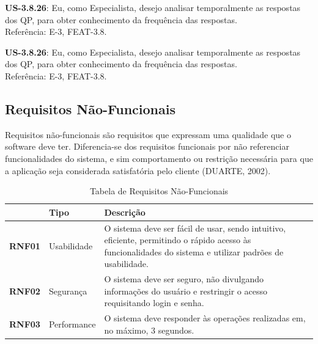 \begin{itemize}
{\begin{itemize}
{					\item \textbf{US-3.8.26}: Eu, como Especialista, desejo analisar temporalmente as respostas dos QP, para obter conhecimento da frequência das respostas.\\
					Referência: E-3, FEAT-3.8.

					\item \textbf{US-3.8.26}: Eu, como Especialista, desejo analisar temporalmente as respostas dos QP, para obter conhecimento da frequência das respostas.\\
					Referência: E-3, FEAT-3.8.
				}
				\end{itemize}
			}
			\end{itemize}


	\subsection{Requisitos Não-Funcionais}

		Requisitos não-funcionais são requisitos que expressam uma qualidade que o software deve ter. Diferencia-se dos requisitos funcionais por não referenciar funcionalidades do sistema, e sim comportamento ou restrição necessária para que a aplicação seja considerada satisfatória pelo cliente (DUARTE, 2002).

		\vspace*{0.5cm}

		\begin{table}[htbp]
			\caption{Tabela de Requisitos Não-Funcionais}
			\begin{tabular}{|l|l|p{11cm}|}
				\hline
				 & \textbf{Tipo} & \textbf{Descrição} \\ \hline
				\textbf{RNF01} & Usabilidade  & O sistema deve ser fácil de usar, sendo intuitivo, eficiente, permitindo o rápido acesso às funcionalidades do sistema e utilizar padrões de usabilidade. \\ \hline

				\textbf{RNF02} & Segurança & O sistema deve ser seguro, não divulgando informações do usuário e restringir o acesso requisitando login e senha. \\ \hline

				\textbf{RNF03} & Performance & O sistema deve responder às operações realizadas em, no máximo, 3 segundos. \\ \hline
			\end{tabular}
		\label{Tabela de Requisitos Não-Funcionais}
		\end{table}


